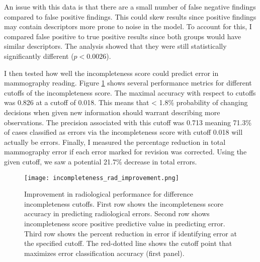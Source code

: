 An issue with this data is that there are a small number of false negative findings compared to false positive findings. This could skew results since positive findings may contain descriptors more prone to noise in the model. To account for this, I compared false positive to true positive results since both groups would have similar descriptors. The analysis showed that they were still statistically significantly different ($p<0.0026$).

\clearpage

I then tested how well the incompleteness score could predict error in mammography reading. Figure \ref{fig:incompleteness_rad_improvement} shows several performance metrics for different cutoffs of the incompleteness score. The maximal accuracy with respect to cutoffs was 0.826 at a cutoff of 0.018. This means that < 1.8\% probability of changing decisions when given new information should warrant describing more observations. The precision associated with this cutoff was 0.713 meaning 71.3\% of cases classified as errors via the incompleteness score with cutoff 0.018 will actually be errors. Finally, I measured the percentage reduction in total mammography error if each error marked for revision was corrected. Using the given cutoff, we saw a potential 21.7\% decrease in total errors.

\begin{figure}
\centering
\texttt{[image: incompleteness\_rad\_improvement.png]}
\caption[Radiological improvement with incompleteness scores]{Improvement in radiological performance for difference incompleteness cutoffs. First row shows the incompleteness score accuracy in predicting radiological errors. Second row shows incompleteness score positive predictive value in predicting error. Third row shows the percent reduction in error if identifying error at the specified cutoff. The red-dotted line shows the cutoff point that maximizes error classification accuracy (first panel).}
\label{fig:incompleteness_rad_improvement}
\end{figure}

